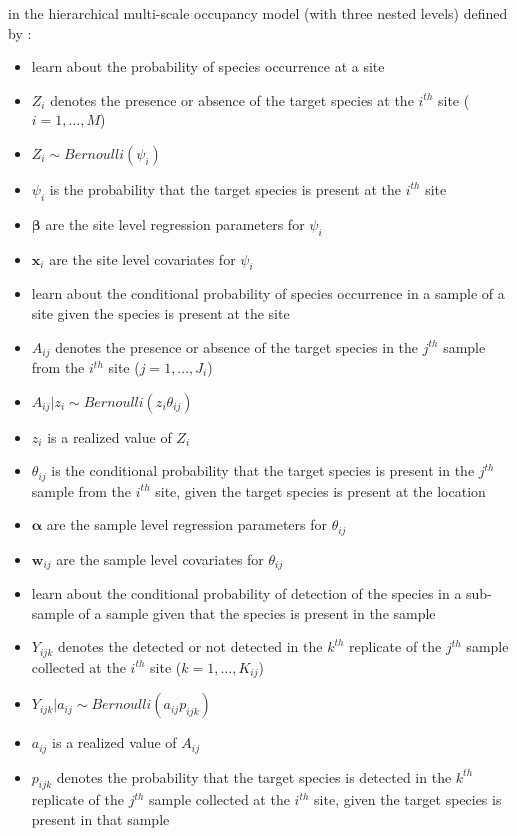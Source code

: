 \documentclass[12pt]{article}\usepackage[]{graphicx}\usepackage[]{color}
\begin{document}
in the hierarchical multi-scale occupancy model (with three nested levels) defined by \cite{Dorazio_Erickson}:
\begin{itemize}
\item learn about the probability of species occurrence at a site 
\item $Z_i$ denotes the presence or absence of the target species at the $i^{th}$ site ($i = 1, \dots, M$)
\item $Z_i \sim Bernoulli(\psi_i)$
\item $\psi_i$ is the probability that the target species is present at the $i^{th}$ site
\item $\bm{\beta}$ are the site level regression parameters for $\psi_i$
\item $\bm{x}_i$ are the site level covariates for $\psi_i$
\item learn about the conditional probability of species occurrence in a sample of a site given the species is present at the site
\item $A_{ij}$ denotes the presence or absence of the target species in the $j^{th}$ sample from the $i^{th}$ site ($j = 1, \dots, J_i$)
\item $A_{ij}|z_i \sim Bernoulli(z_i\theta_{ij})$
\item $z_i$ is a realized value of $Z_i$
\item $\theta_{ij}$ is the conditional probability that the target species is present in the $j^{th}$ sample from the $i^{th}$ site, given the target species is present at the location 
\item $\bm{\alpha}$ are the sample level regression parameters for $\theta_{ij}$
\item $\bm{w}_{ij}$ are the sample level covariates for $\theta_{ij}$
\item learn about the conditional probability of detection of the species in a sub-sample of a sample given that the species is present in the sample
\item $Y_{ijk}$ denotes the detected or not detected in the $k^{th}$ replicate of the $j^{th}$ sample collected at the $i^{th}$ site ($k = 1, \dots, K_{ij}$)
\item $Y_{ijk}|a_{ij} \sim Bernoulli(a_{ij}p_{ijk})$
\item $a_{ij}$ is a realized value of $A_{ij}$
\item $p_{ijk}$ denotes the probability that the target species is detected in the $k^{th}$ replicate of the $j^{th}$ sample collected at the $i^{th}$ site, given the target species is present in that sample

\end{itemize}
\end{document}
